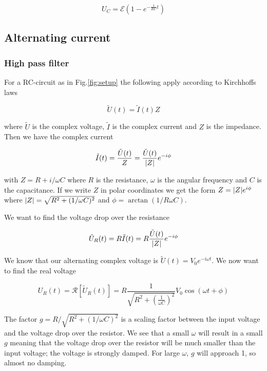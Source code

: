 \documentclass[../main/main.tex]{subfiles}
\begin{document}
\begin{equation}
  \label{lolleren2}
  U_C = \mathcal{E} \left( 1 - e^{- \frac{1}{RC} t} \right)
\end{equation}

\subsection*{Alternating current}
\subsubsection{High pass filter}

For a RC-circuit as in Fig.\ref{fig:setup} the following apply according to Kirchhoffs laws

\begin{equation}
	\tilde{U}(t) = \tilde{I}(t)Z
\end{equation}

where \( \tilde{U} \) is the complex voltage, \( \tilde{I} \) is the complex current and \( Z \) is the impedance. Then we have the complex current

\begin{equation}
	\tilde{I}(t) = \frac{\tilde{U}(t)}{Z} = \frac{\tilde{U}(t)}{ \abs{Z}} e^{-i \phi}
\end{equation}

with \( Z = R + i/ \omega C \) where \( R \) is the resistance, \(\omega \) is the angular frequency and \( C \) is the capacitance.
If we write \( Z \) in polar coordinates we get the form \( Z = \abs{Z} e^{i \phi} \) where \( \abs{Z} = \sqrt{R^2 + (1/\omega C)^2} \) and \( \phi = \arctan(1 / R \omega C ) \).

We want to find the voltage drop over the resistance

\begin{equation}
	\tilde{U}_R(t) = R \tilde{I}(t) = R \frac{\tilde{U}(t)}{ \abs{Z}} e^{-i \phi}
\end{equation}

We know that our alternating complex voltage is \( \tilde{U}(t) = V_0 e^{-i \omega t } \).
We now want to find the real voltage

\begin{equation}
	U_R(t) = \mathcal{R}[\tilde{U}_R(t)] = R \frac{1}{ \sqrt{R^2 + \left( \frac{1}{ \omega C } \right)^2 } } V_0 \cos ( \omega t + \phi)
\end{equation}

The factor \( g = R / \sqrt{R^2 + ( 1 / \omega C )^2} \) is a scaling factor between the input voltage and the voltage drop over the resistor.
We see that a small \( \omega \) will result in a small \( g \) meaning that the voltage drop over the resistor will be much smaller than the input voltage; the voltage is strongly damped.
For large \( \omega \), \( g \) will approach 1, so almost no damping.
\end{document}
